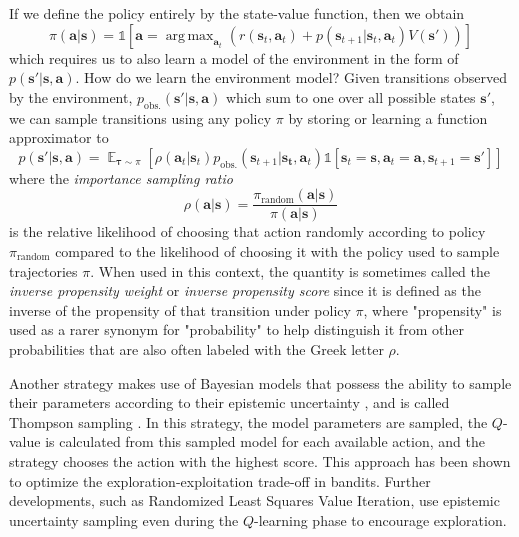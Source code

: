 \documentclass{article}
\DeclareMathOperator*{\argmax}{arg\,max}
\begin{document}
If we define the policy entirely by the state-value function, then we obtain \begin{equation}\pi(\mathbf{a}|\mathbf{s})=\mathbb{1}\left[\mathbf{a}=\argmax_{\mathbf{a}_t}\left(r(\mathbf{s}_t,\mathbf{a}_t)+p(\mathbf{s}_{t+1}|\mathbf{s}_t,\mathbf{a}_t)V(\mathbf{s}')\right)\right]\end{equation}which requires us to also learn a model of the environment in the form of $p(\mathbf{s}'|\mathbf{s},\mathbf{a})$. How do we learn the environment model? Given transitions observed by the environment, $p_\text{obs.}(\mathbf{s}'|\mathbf{s},\mathbf{a})$ which sum to one over all possible states $\mathbf{s}'$, we can sample transitions using any policy $\pi$ by storing or learning a function approximator to \begin{equation}p(\mathbf{s}'|\mathbf{s},\mathbf{a})=\mathop{\mathbb{E}}_{\boldsymbol{\tau}\sim\pi}\left[\rho(\mathbf{a}_t|\mathbf{s}_t)p_\text{obs.}(\mathbf{s}_{t+1}|\mathbf{s_t},\mathbf{a}_t)\mathbb{1}\left[\mathbf{s}_t=\mathbf{s},\mathbf{a}_t=\mathbf{a},\mathbf{s}_{t+1}=\mathbf{s}'\right]\right]\end{equation}where the \textit{importance sampling ratio}
\begin{equation}\rho(\mathbf{a}|\mathbf{s})=\frac{\pi_\text{random}(\mathbf{a}|\mathbf{s})}{\pi(\mathbf{a}|\mathbf{s})}\end{equation}is the relative likelihood of choosing that action randomly according to policy $\pi_\text{random}$ compared to the likelihood of choosing it with the policy used to sample trajectories $\pi$. When used in this context, the quantity is sometimes called the \textit{inverse propensity weight} or \textit{inverse propensity score} since it is defined as the inverse of the propensity of that transition under policy $\pi$, where "propensity" is used as a rarer synonym for "probability" to help distinguish it from other probabilities that are also often labeled with the Greek letter $\rho$.

Another strategy makes use of Bayesian models that possess the ability to sample their parameters according to their epistemic uncertainty \cite{GP_BLR}, and is called Thompson sampling \cite{thompson_sampling}. In this strategy, the model parameters are sampled, the $Q$-value is calculated from this sampled model for each available action, and the strategy chooses the action with the highest score. This approach has been shown to optimize the exploration-exploitation trade-off in bandits\cite{thompson_sampling,bootstrap_DQN}. Further developments, such as Randomized Least Squares Value Iteration, use epistemic uncertainty sampling even during the $Q$-learning phase\cite{RLSVI} to encourage exploration.
\end{document}
